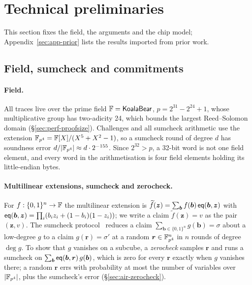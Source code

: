 \section{Technical preliminaries}
\label{sec:prelim}

This section fixes the field, the arguments and the chip model; Appendix~\ref{sec:app-prior} lists the results imported from prior work.

\subsection{Field, sumcheck and commitments}
\label{sec:prelim-field}
\label{sec:prelim-args}

\paragraph{Field.} All traces live over the prime field $\mathbb{F} = \mathsf{KoalaBear}{}$, $p = 2^{31} - 2^{24} + 1$, whose multiplicative group has two-adicity 24, which bounds the largest Reed--Solomon domain (\S\ref{sec:perf-proofsize}). Challenges and all sumcheck arithmetic use the extension $\mathbb{F}_{p^4} = \mathbb{F}[X]/(X^5 + X^2 - 1)$, so a sumcheck round of degree $d$ has soundness error $d/|\mathbb{F}_{p^4}| \approx d \cdot 2^{-155}$. Since $2^{32} > p$, a 32-bit word is not one field element, and every word in the arithmetisation is four field elements holding its little-endian bytes.

\paragraph{Multilinear extensions, sumcheck and zerocheck.} For $f: \{0,1\}^n \to \mathbb{F}$ the multilinear extension is $\widetilde f(\bm z) = \sum_{\bm b} f(\bm b)\,\mathsf{eq}(\bm b, \bm z)$ with $\mathsf{eq}(\bm b, \bm z) = \prod_i (b_i z_i + (1-b_i)(1-z_i))$; we write a claim $\widetilde f(\bm z) = v$ as the pair $(\bm z, v)$. The sumcheck protocol~\citep{lund1992algebraic} reduces a claim $\sum_{\bm b \in \{0,1\}^n} g(\bm b) = \sigma$ about a low-degree $g$ to a claim $g(\bm r) = \sigma'$ at a random $\bm r \in \mathbb{F}_{p^4}^n$ in $n$ rounds of degree $\deg g$. To show that $g$ vanishes on a subcube, a \emph{zerocheck} samples $\bm r$ and runs a sumcheck on $\sum_{\bm b} \mathsf{eq}(\bm b, \bm r)\, g(\bm b)$, which is zero for every $\bm r$ exactly when $g$ vanishes there; a random $\bm r$ errs with probability at most the number of variables over $|\mathbb{F}_{p^4}|$, plus the sumcheck's error (\S\ref{sec:air-zerocheck}).

